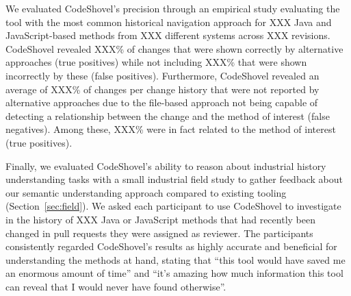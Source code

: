We evaluated CodeShovel's precision through an empirical study evaluating the tool with the most common historical navigation approach for XXX Java and JavaScript-based methods from XXX different systems across XXX revisions.
CodeShovel revealed XXX\% of changes that were shown correctly by alternative approaches (true positives) while not including XXX\% that were shown incorrectly by these (false positives). 
Furthermore, CodeShovel revealed an average of XXX\% of changes per change history that were not reported by alternative approaches due to the file-based approach not being capable of detecting a relationship between the change and the method of interest (false negatives). 
Among these, XXX\% were in fact related to the method of interest (true positives).
~



Finally, we evaluated CodeShovel's ability to reason about industrial history understanding tasks with a small industrial field study to gather feedback about our semantic understanding approach compared to existing tooling (Section~\ref{sec:field}). 
We asked each participant to use CodeShovel to investigate in the history of XXX Java or JavaScript methods that had recently been changed in pull requests they were assigned as reviewer. 
The participants consistently regarded CodeShovel's results as highly accurate and beneficial for understanding the methods at hand, stating that ``this tool would have saved me an enormous amount of time'' and ``it's amazing how much information this tool can reveal that I would never have found otherwise''. 

